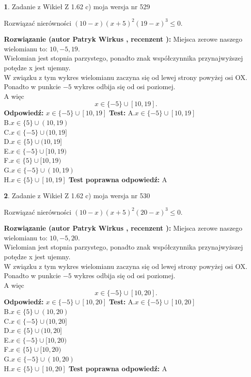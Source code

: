 \documentclass[12pt, a4paper]{article}
\theoremstyle{definition} %
\newtheorem{zad}{}
\newcommand{\zadStart}[1]{\begin{zad}#1\newline}
\newcommand{\zadStop}{\end{zad}}
\newcommand{\rozwStart}[2]{\noindent \textbf{Rozwiązanie (autor #1 , recenzent #2): }\newline}
\newcommand{\rozwStop}{\newline}
\newcommand{\odpStart}{\noindent \textbf{Odpowiedź:}\newline}
\newcommand{\odpStop}{\newline}
\newcommand{\testStart}{\noindent \textbf{Test:}\newline}
\newcommand{\testStop}{\newline}
\newcommand{\kluczStart}{\noindent \textbf{Test poprawna odpowiedź:}\newline}
\newcommand{\kluczStop}{\newline}
\begin{document}
\zadStart{Zadanie z Wikieł Z 1.62 c) moja wersja nr 529}

Rozwiązać nierówności $(10-x)(x+5)^{2}(19-x)^{3}\le0$.
\zadStop
\rozwStart{Patryk Wirkus}{}
Miejsca zerowe naszego wielomianu to: $10, -5, 19$.\\
Wielomian jest stopnia parzystego, ponadto znak współczynnika przy\linebreak najwyższej potędze x jest ujemny.\\ W związku z tym wykres wielomianu zaczyna się od lewej strony powyżej osi OX.\\
Ponadto w punkcie $-5$ wykres odbija się od osi poziomej.\\
A więc $$x \in \{-5\} \cup [10,19].$$
\rozwStop
\odpStart
$x \in \{-5\} \cup [10,19]$
\odpStop
\testStart
A.$x \in \{-5\} \cup [10,19]$\\
B.$x \in \{5\} \cup (10,19)$\\
C.$x \in \{-5\} \cup (10,19]$\\
D.$x \in \{5\} \cup (10,19]$\\
E.$x \in \{-5\} \cup [10,19)$\\
F.$x \in \{5\} \cup [10,19)$\\
G.$x \in \{-5\} \cup (10,19)$\\
H.$x \in \{5\} \cup [10,19]$
\testStop
\kluczStart
A
\kluczStop



\zadStart{Zadanie z Wikieł Z 1.62 c) moja wersja nr 530}

Rozwiązać nierówności $(10-x)(x+5)^{2}(20-x)^{3}\le0$.
\zadStop
\rozwStart{Patryk Wirkus}{}
Miejsca zerowe naszego wielomianu to: $10, -5, 20$.\\
Wielomian jest stopnia parzystego, ponadto znak współczynnika przy\linebreak najwyższej potędze x jest ujemny.\\ W związku z tym wykres wielomianu zaczyna się od lewej strony powyżej osi OX.\\
Ponadto w punkcie $-5$ wykres odbija się od osi poziomej.\\
A więc $$x \in \{-5\} \cup [10,20].$$
\rozwStop
\odpStart
$x \in \{-5\} \cup [10,20]$
\odpStop
\testStart
A.$x \in \{-5\} \cup [10,20]$\\
B.$x \in \{5\} \cup (10,20)$\\
C.$x \in \{-5\} \cup (10,20]$\\
D.$x \in \{5\} \cup (10,20]$\\
E.$x \in \{-5\} \cup [10,20)$\\
F.$x \in \{5\} \cup [10,20)$\\
G.$x \in \{-5\} \cup (10,20)$\\
H.$x \in \{5\} \cup [10,20]$
\testStop
\kluczStart
A
\kluczStop
\end{document}
